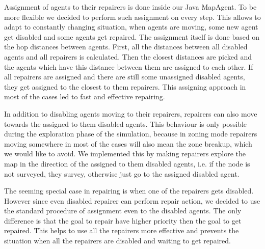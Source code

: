 Assignment of agents to their repairers is done inside our Java MapAgent. To be more flexible we decided to perform such assignment on every step. This allows to adapt to constantly changing situation, when agents are moving, some new agent get disabled and some agents get repaired. The assignment itself is done based on the hop distances between agents. First, all the distances between all disabled agents and all repairers is calculated. Then the closest distances are picked and the agents which have this distance between them are assigned to each other. If all repairers are assigned and there are still some unassigned disabled agents, they get assigned to the closest to them repairers. This assigning approach in most of the cases led to fast and effective repairing.

In addition to disabling agents moving to their repairers, repairers can also move towards the assigned to them disabled agents. This behaviour is only possible during the exploration phase of the simulation, because in zoning mode repairers moving somewhere in most of the cases will also mean the zone breakup, which we would like to avoid. We implemented this by making repairers explore the map in the direction of the assigned to them disabled agents, i.e. if the node is not surveyed, they survey, otherwise just go to the assigned disabled agent.

The seeming special case in repairing is when one of the repairers gets disabled. However since even disabled repairer can perform repair action, we decided to use the standard procedure of assignment even to the disabled agents. The only difference is that the goal to repair have higher priority then the goal to get repaired. This helps to use all the repairers more effective and prevents the situation when all the repairers are disabled and waiting to get repaired.

